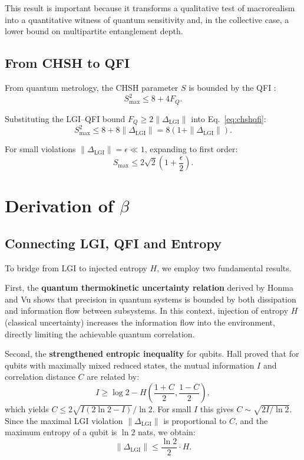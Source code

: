 \documentclass[a4paper]{quantumarticle}
\begin{document}
This result is important because it transforms a qualitative test of macrorealism into a quantitative witness of quantum sensitivity and, in the collective case, a lower bound on multipartite entanglement depth.

\subsection{From CHSH to QFI}

From quantum metrology, the CHSH parameter $S$ is bounded by the QFI \cite{seshadreesan2013chsh}:
\begin{equation}
S_{\max}^2 \leq 8 + 4 F_Q. \label{eq:chshqfi}
\end{equation}

Substituting the LGI--QFI bound $F_Q \geq 2 \| \Delta_{\text{LGI}} \|$ into Eq.~\eqref{eq:chshqfi}:
\begin{equation}
S_{\max}^2 \leq 8 + 8 \| \Delta_{\text{LGI}} \| = 8(1 + \| \Delta_{\text{LGI}} \|). \label{eq:chshlgi}
\end{equation}

For small violations $\| \Delta_{\text{LGI}} \| = \epsilon \ll 1$, expanding to first order:
\begin{equation}
S_{\max} \leq 2\sqrt{2} \left(1 + \frac{\epsilon}{2}\right). \label{eq:chshlgi_small}
\end{equation}

\section{Derivation of $\beta$}

\subsection{Connecting LGI, QFI and Entropy}

To bridge from LGI to injected entropy $H$, we employ two fundamental results.

First, the \textbf{quantum thermokinetic uncertainty relation} derived by Honma and Vu \cite{honma2025thermo} shows that precision in quantum systems is bounded by both dissipation and information flow between subsystems. In this context, injection of entropy $H$ (classical uncertainty) increases the information flow into the environment, directly limiting the achievable quantum correlation.

Second, the \textbf{strengthened entropic inequality} for qubits. Hall \cite{hall2013correlation} proved that for qubits with maximally mixed reduced states, the mutual information $I$ and correlation distance $C$ are related by:
\[
I \geq \log 2 - H\left(\frac{1+C}{2}, \frac{1-C}{2}\right),
\]
which yields $C \leq 2\sqrt{I(2\ln 2 - I)}/\ln 2$. For small $I$ this gives $C \sim \sqrt{2I/\ln 2}$. Since the maximal LGI violation $\| \Delta_{\text{LGI}} \|$ is proportional to $C$, and the maximum entropy of a qubit is $\ln 2$ nats, we obtain:
\[
\| \Delta_{\text{LGI}} \| \leq \frac{\ln 2}{2} \cdot H.
\]
\end{document}
